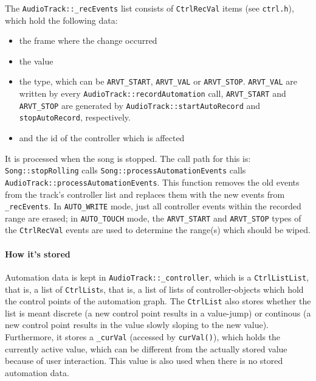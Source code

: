 \documentclass[a4paper]{report}
\begin{document}
The \texttt{AudioTrack::\_recEvents} list consists of \texttt{CtrlRecVal}
items (see \texttt{ctrl.h}), which hold the following data:
\begin{itemize}
\item the frame where the change occurred
\item the value
\item the type, which can be \texttt{ARVT\_START}, \texttt{ARVT\_VAL} or \texttt{ARVT\_STOP}.
      \texttt{ARVT\_VAL} are written by every \texttt{AudioTrack::recordAutomation}
      call, \texttt{ARVT\_START} and \texttt{ARVT\_STOP} are generated by
      \texttt{AudioTrack::startAutoRecord} and \texttt{stopAutoRecord},
      respectively.
\item and the id of the controller which is affected
\end{itemize}
It is processed when the song is stopped. The call path for this is:
\texttt{Song::stopRolling} calls \texttt{Song::processAutomationEvents}
calls \texttt{AudioTrack::processAutomationEvents}.
This function removes the old events from the track's controller list
and replaces them with the new events from \texttt{\_recEvents}. In
\texttt{AUTO\_WRITE} mode, just all controller events within the recorded
range are erased; in \texttt{AUTO\_TOUCH} mode, the \texttt{ARVT\_START}
and \texttt{ARVT\_STOP} types of the \texttt{CtrlRecVal} events are used
to determine the range(s) which should be wiped.

\paragraph{How it's stored}
Automation data is kept                                                  %
in \texttt{AudioTrack::\_controller}, which is a \texttt{CtrlListList},  %
that is, a list of \texttt{CtrlList}s, that is, a list of lists of
controller-objects which hold the control points of the automation graph.
The \texttt{CtrlList} also stores whether the list is meant discrete
(a new control point results in a value-jump) or continous (a new control
point results in the value slowly sloping to the new value).
Furthermore, it stores a \texttt{\_curVal} (accessed by \texttt{curVal()}),
which holds the currently active value, which can be different from the
actually stored value because of user interaction. This value is also
used when there is no stored automation data.
\end{document}
